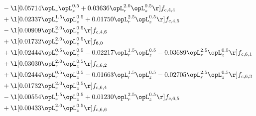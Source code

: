 \begin{alignat}{2}
& - \l[  0.05714 \opL_r \opL_z^{0.5} +  0.03636 \opL_r^{2.0} \opL_z^{0.5}  \r] f_{c,4,4} \nonumber \\ 
& + \l[  0.02337 \opL_r^{1.5} \opL_z^{0.5} +  0.01750 \opL_r^{2.5} \opL_z^{0.5}  \r] f_{c,4,5} \nonumber \\ 
& - \l[  0.00909 \opL_r^{2.0} \opL_z^{0.5}  \r] f_{c,4,6} \nonumber \\ 
& + \l[  0.01732 \opL_r^{2.0} \opL_z^{0.5}  \r] f_{6,0} \nonumber \\ 
& + \l[  0.02444 \opL_r^{0.5} \opL_z^{0.5}   -0.02217 \opL_r^{1.5} \opL_z^{0.5}   -0.03689 \opL_r^{2.5} \opL_z^{0.5}  \r] f_{c,6,1} \nonumber \\ 
& + \l[  0.03030 \opL_r^{2.0} \opL_z^{0.5}  \r] f_{c,6,2} \nonumber \\ 
& + \l[  0.02444 \opL_r^{0.5} \opL_z^{0.5}   -0.01663 \opL_r^{1.5} \opL_z^{0.5}   -0.02705 \opL_r^{2.5} \opL_z^{0.5}  \r] f_{c,6,3} \nonumber \\ 
& + \l[  0.01732 \opL_r^{2.0} \opL_z^{0.5}  \r] f_{c,6,4} \nonumber \\ 
& - \l[  0.00554 \opL_r^{1.5} \opL_z^{0.5} +  0.01230 \opL_r^{2.5} \opL_z^{0.5}  \r] f_{c,6,5} \nonumber \\ 
& + \l[  0.00433 \opL_r^{2.0} \opL_z^{0.5}  \r] f_{c,6,6} \nonumber \\ 
\end{alignat} 



